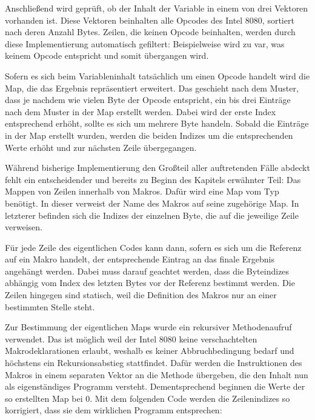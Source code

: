 Anschließend wird geprüft, ob der Inhalt der Variable  in einem von drei Vektoren vorhanden ist. Diese Vektoren beinhalten alle Opcodes des Intel 8080, sortiert nach deren Anzahl Bytes. Zeilen, die keinen Opcode beinhalten, werden durch diese Implementierung automatisch gefiltert: Beispielweise wird  zu \glqq var\grqq, was keinem Opcode entspricht und somit übergangen wird.

Sofern es sich beim Variableninhalt tatsächlich um einen Opcode handelt wird die Map, die das Ergebnis repräsentiert erweitert. Das geschieht nach dem Muster, dass je nachdem wie vielen Byte der Opcode entspricht, ein bis drei Einträge nach dem Muster  in der Map erstellt werden. Dabei wird der erste Index entsprechend erhöht, sollte es sich um mehrere Byte handeln. Sobald die Einträge in der Map erstellt wurden, werden die beiden Indizes um die entsprechenden Werte erhöht und zur nächsten Zeile übergegangen.
\linebreak

Während bisherige Implementierung den Großteil aller auftretenden Fälle abdeckt fehlt ein entscheidender und bereits zu Beginn des Kapitels erwähnter Teil: Das Mappen von Zeilen innerhalb von Makros. Dafür wird eine Map vom Typ  benötigt. In dieser verweist der Name des Makros auf seine zugehörige Map. In letzterer befinden sich die Indizes der einzelnen Byte, die auf die jeweilige Zeile verweisen. 

Für jede Zeile des eigentlichen Codes kann dann, sofern es sich um die Referenz auf ein Makro handelt, der entsprechende Eintrag an das finale Ergebnis angehängt werden. Dabei muss darauf geachtet werden, dass die Byteindizes abhängig vom Index des letzten Bytes vor der Referenz bestimmt werden. Die Zeilen hingegen sind statisch, weil die Definition des Makros nur an einer bestimmten Stelle steht.

Zur Bestimmung der eigentlichen Maps wurde ein rekursiver Methodenaufruf verwendet. Das ist möglich weil der Intel 8080 keine verschachtelten Makrodeklarationen erlaubt, weshalb es keiner Abbruchbedingung bedarf und höchstens ein Rekursionsabstieg stattfindet. Dafür werden die Instruktionen des Makros in einem separaten Vektor an die Methode übergeben, die den Inhalt nun als eigenständiges Programm versteht. Dementsprechend beginnen die Werte der so erstellten Map  bei 0. Mit dem folgenden Code werden die Zeilenindizes so korrigiert, dass sie dem \glqq wirklichen\grqq{} Programm entsprechen:

